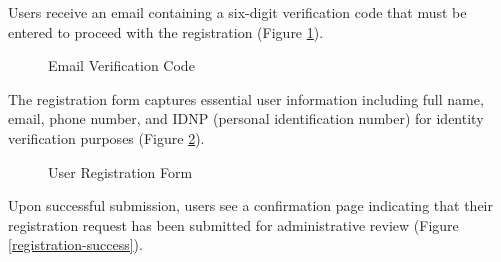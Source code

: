 Users receive an email containing a six-digit verification code that must be entered to proceed with the registration (Figure \ref{registration-email}).

\begin{figure}[H]
    \centering
    \caption{Email Verification Code}
    \label{registration-email}
\end{figure}

The registration form captures essential user information including full name, email, phone number, and IDNP (personal identification number) for identity verification purposes (Figure \ref{registration-form}).

\begin{figure}[H]
    \centering
    \caption{User Registration Form}
    \label{registration-form}
\end{figure}

Upon successful submission, users see a confirmation page indicating that their registration request has been submitted for administrative review (Figure \ref{registration-success}).

